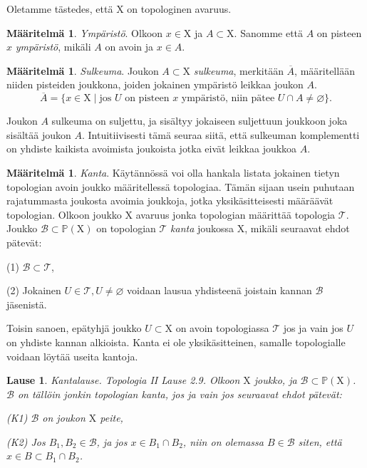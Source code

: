 \documentclass[12pt,a4paper,leqno]{report}
\newcommand{\X}{\mathrm{X}}
\newcommand{\Pow}{\mathbb{P}}
\newcommand{\B}{\mathcal{B}}
\newcommand{\T}{\mathcal{T}}
\theoremstyle{plain}
\newtheorem{lause}[equation]{Lause}
\theoremstyle{definition}
\newtheorem{maar}[equation]{Määritelmä}
\theoremstyle{remark}
\begin{document}
Oletamme tästedes, että $\X$ on topologinen avaruus.

\begin{maar}\label{ymp}
\emph{Ympäristö}. Olkoon $x \in \X$ ja $A \subset \X$. Sanomme että $A$ on pisteen $x$ \emph{ympäristö}, mikäli $A$ on avoin ja $x \in A$.
\end{maar}

\begin{maar}\label{sulk}
\emph{Sulkeuma}. Joukon $A \subset \X$ \emph{sulkeuma}, merkitään $\overline{A}$, määritellään niiden pisteiden joukkona, joiden jokainen ympäristö leikkaa joukon $A$.
\begin{equation}
\overline{A} = \{ x \in \X \mid \text{jos } U \text{ on pisteen } x \text{ ympäristö, niin pätee } U \cap A \not= \varnothing \}\text{.}
\end{equation}
\end{maar}

Joukon $A$ sulkeuma on suljettu, ja sisältyy jokaiseen suljettuun joukkoon joka sisältää joukon $A$. Intuitiivisesti tämä seuraa siitä, että sulkeuman komplementti on yhdiste kaikista avoimista joukoista jotka eivät leikkaa joukkoa $A$.

\begin{maar}\label{kantamaar}
\emph{Kanta}. Käytännössä voi olla hankala listata jokainen tietyn topologian avoin joukko määritellessä topologiaa. Tämän sijaan usein puhutaan rajatummasta joukosta avoimia joukkoja, jotka yksikäsitteisesti määräävät topologian. Olkoon joukko $\X$ avaruus jonka topologian määrittää topologia $\T$. Joukko $\B \subset \Pow(\X)$ on topologian $\T$ \emph{kanta} joukossa $\X$, mikäli seuraavat ehdot pätevät:

(1) $\B \subset \T$,

(2) Jokainen $U \in \T, U \not= \varnothing$ voidaan lausua yhdisteenä joistain kannan $\B$ jäsenistä.
\end{maar}

Toisin sanoen, epätyhjä joukko $U \subset \X$ on avoin topologiassa $\T$ jos ja vain jos $U$ on yhdiste kannan alkioista. Kanta ei ole yksikäsitteinen, samalle topologialle voidaan löytää useita kantoja.

\begin{lause}\label{kantalause}
\emph{Kantalause. Topologia II \cite{Topo} Lause 2.9}. Olkoon $\X$ joukko, ja $\B \subset \Pow(\X)$. $\B$ on tällöin jonkin topologian kanta, jos ja vain jos seuraavat ehdot pätevät:

(K1) $\B$ on joukon $\X$ peite,

(K2) Jos $B_1, B_2 \in \B$, ja jos $x \in B_1 \cap B_2$, niin on olemassa $B \in \B$ siten, että $x \in B \subset B_1 \cap B_2$.
\end{lause}
\end{document}
